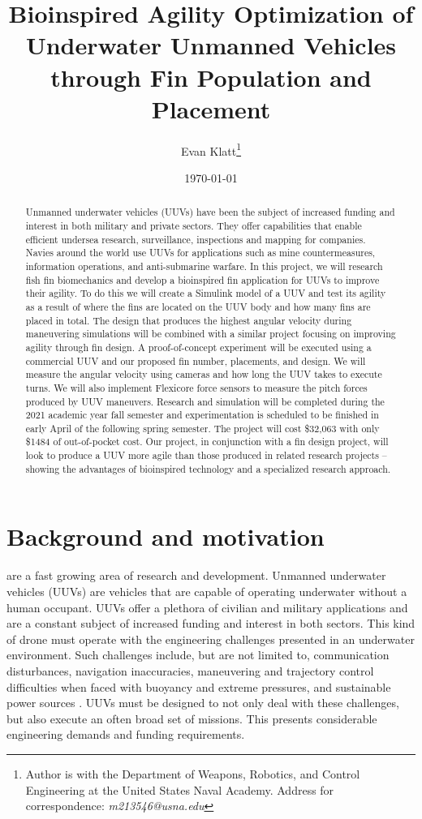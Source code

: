 \documentclass{IEEEtran}
\title{Bioinspired Agility Optimization of Underwater Unmanned Vehicles through Fin Population and Placement}
\author{Evan Klatt\thanks{Author is with the Department of Weapons, Robotics, and Control Engineering at the United States Naval Academy. Address for correspondence: \emph{m213546@usna.edu}}}
\date{\today}
\begin{document}
\maketitle
\begin{abstract}
Unmanned underwater vehicles (UUVs) have been the subject of increased funding and interest in both military and private sectors. They offer capabilities that enable efficient undersea research, surveillance, inspections and mapping for companies. Navies around the world use UUVs for applications such as mine countermeasures, information operations, and anti-submarine warfare. In this project, we will research fish fin biomechanics and develop a bioinspired fin application for UUVs to improve their agility. To do this we will create a Simulink model of a UUV and test its agility as a result of where the fins are located on the UUV body and how many fins are placed in total. The design that produces the highest angular velocity during maneuvering simulations will be combined with a similar project focusing on improving agility through fin design. A proof-of-concept experiment will be executed using a commercial UUV and our proposed fin number, placements, and design. We will measure the angular velocity using cameras and how long the UUV takes to execute turns. We will also implement Flexicore force sensors to measure the pitch forces produced by UUV maneuvers. Research and simulation will be completed during the 2021 academic year fall semester and experimentation is scheduled to be finished in early April of the following spring semester. The project will cost \$32,063 with only \$1484 of out-of-pocket cost. Our project, in conjunction with a fin design project, will look to produce a UUV more agile than those produced in related research projects  -- showing the advantages of bioinspired technology and a specialized research approach.
\end{abstract}

\section{Background and motivation}
 are a fast growing area of research and development. Unmanned underwater vehicles (UUVs) are vehicles that are capable of operating underwater without a human occupant. UUVs offer a plethora of civilian and military applications and are a constant subject of increased funding and interest in both sectors. This kind of drone must operate with the engineering challenges presented in an underwater environment. Such challenges include, but are not limited to, communication disturbances, navigation inaccuracies, maneuvering and trajectory control difficulties when faced with buoyancy and extreme pressures, and sustainable power sources \cite{nrc2005autonomous}. UUVs must be designed to not only deal with these challenges, but also execute an often broad set of missions. This presents considerable engineering demands and funding requirements.
\end{document}
